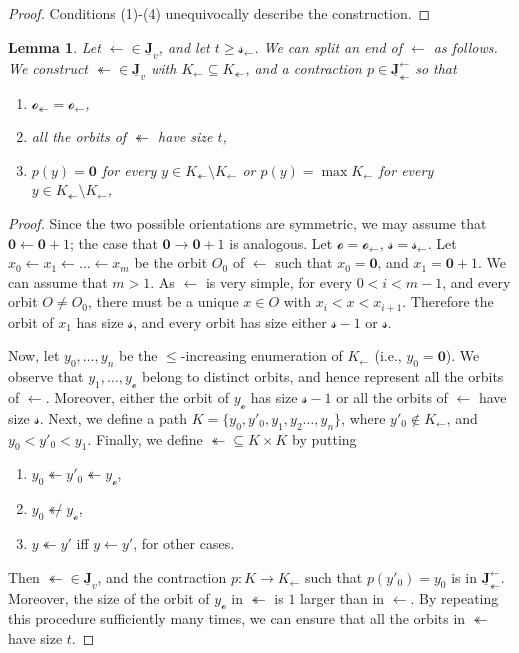 \documentclass[12pt]{amsart}
\numberwithin{equation}{section}
\theoremstyle{plain}
\newtheorem{lemma}[theorem]{Lemma}
\theoremstyle{definition}
\newcommand \la{\leftarrow}
\newcommand \ra{\rightarrow}
\newcommand \tla{\twoheadleftarrow}
\newcommand \rt{\mathbf{0}}
\newcommand \JJub{\underline{\mathbf{J}}}
\newcommand \oo{\mathcal{o}}
\newcommand \sss{\mathcal{s}}
\begin{document}
\begin{proof}
Conditions (1)-(4) unequivocally describe the construction.
\end{proof}

\begin{lemma}
	\label{le:SameLengthOfOrbits}
	Let $\leftarrow \in \JJub_v$, and let $t \geq \sss_\la$. We can split an end of $\la$ as follows.  We construct $\twoheadleftarrow \in \JJub_v$ with $K_\la \subseteq K_\tla$, and a contraction $p \in \JJub_\twoheadleftarrow^\leftarrow$ so that  
\begin{enumerate}
	\item $\oo_\twoheadleftarrow=\oo_\leftarrow$,
	\item all the orbits of $\twoheadleftarrow$ have size $t$,
	\item $p(y)=\rt$ for every $y \in K_\tla \setminus K_\la$ or $p(y)=\max K_\la$ for every $y \in K_\tla \setminus K_\la$,  
\end{enumerate}
\end{lemma}

\begin{proof}
Since the two possible orientations are symmetric, we may assume that $\rt \la  \rt+1$; the case that $\rt \ra  \rt+1$ is analogous. Let $\oo=\oo_\la$, $\sss=\sss_\la$. Let $x_0 \la x_1  \la  \ldots \la x_m$ be the orbit $O_0$ of $\leftarrow$ such that $x_0=\rt$, and $x_1=\rt+1$. We can assume that $m>1$.  As $\leftarrow$ is very simple, for every $0<i<m-1$, and every orbit $O \neq O_0$, there must be a unique $x \in O$ with $x_i < x<x_{i+1}$. Therefore the orbit of $x_1$ has size $\sss$, and every orbit has size either $\sss-1$ or $\sss$. 

Now, let $y_0, \ldots,y_n$ be the $\leq$-increasing enumeration of $K_\la$ (i.e., $y_0=\rt$). We observe that $y_1,\ldots,y_{\oo}$ belong to distinct orbits, and
hence represent all the orbits of $\la$.  Moreover, either the orbit of $y_{\oo}$ has size $\sss-1$ or all the orbits of $\la$ have size $\sss$.  Next, we define a path $K=\{ y_0, y'_0, y_1, y_2 \ldots, y_n \}$, where $y'_0 \not \in K_\la$, and $y_0< y'_0<y_1$. Finally, we define  $\twoheadleftarrow \subseteq K \times K$ by putting
%
\begin{enumerate}
\item $y_0 \twoheadleftarrow y'_0 \twoheadleftarrow y_{\oo}$,
\item $y_0 \not \twoheadleftarrow y_{\oo}$,
\item  $y \twoheadleftarrow y'$ iff $y \la y'$, for other cases. 
\end{enumerate}
%
Then $\twoheadleftarrow \in \JJub_v$, and the contraction $p: K \to K_\la$ such that $p(y'_0)=y_0$ is in $\JJub^\la_\tla$. Moreover, the size of the orbit of $y_{\oo}$ in $\twoheadleftarrow$ is $1$ larger than in $\la$.  By repeating this procedure sufficiently many times, we can ensure that all the orbits in $\tla$ have size $t$.
\end{proof}
\end{document}
